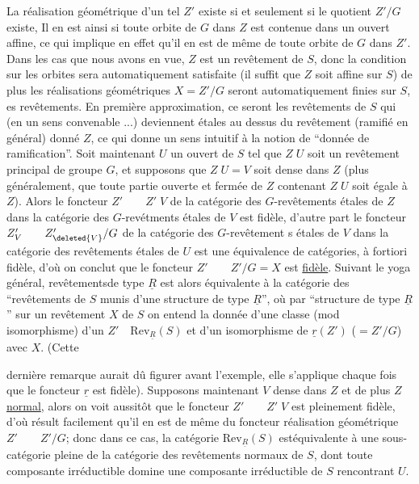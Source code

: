 La réalisation géométrique d'un tel $Z'$ existe si et seulement si le quotient $Z'/G$ existe,  Il en est ainsi si toute orbite de $G$ dans $Z$ est contenue dans un ouvert affine, ce qui implique en effet qu'il en est de même de toute orbite de $G$ dans $Z'$.  Dans les cas que nous avons en vue, $Z$ est un revêtement de $S$, donc la condition sur les orbites sera automatiquement satisfaite (il suffit que $Z$ soit affine sur $S$) de plus les réalisations géométriques $X=Z'/G$ seront automatiquement finies sur $S$,  es revêtements. En première approximation, ce seront les revêtements de $S$ qui (en  un sens convenable ...) deviennent étales au dessus du revêtement (ramifié en général) donné $Z$, ce qui donne un sens intuitif à la notion de ``donnée de ramification''. Soit maintenant $U$ un ouvert de $S$ tel que $Z\;U$ soit un revêtement principal de groupe $G$, et supposons que $Z\;U=V$ soit dense dans $Z$ (plus généralement, que toute partie ouverte et fermée de $Z$ contenant $Z\;U$  soit égale à $Z$). Alors le foncteur $Z'\qquad Z'\;V$ de la catégorie des $G$-revêtements étales de $Z$ dans la catégorie des $G$-revétments étales de $V$ est fidèle, d'autre part le foncteur $Z'_V\qquad Z'_{\deleted{V}}/G$ de la catégorie des $G$-revêtement s étales de $V$ dans la catégorie des revêtements étales de $U$ est une équivalence de catégories, à fortiori fidèle, d'où on conclut que le foncteur  $Z'\qquad Z'/G=X$ est \uline{fidèle}. Suivant le yoga général,  revêtementsde type $\underline{R}$  est alors équivalente à la catégorie des ``revêtements de $S$ munis d'une structure de type $\underline{R}$'', où par ``structure de type $\underline{R}$'' sur un revêtement $X$ de $S$ on entend la donnée d'une classe (mod isomorphisme) d'un $Z'\quad\mathrm{Rev}_{\underline{R}}(S)$ et d'un isomorphisme de $\underline{r}(Z')$ ($=Z'/G$) avec $X$. (Cette

dernière remarque aurait dû figurer avant l'exemple, elle s'applique chaque fois que le foncteur $\underline{r}$ est fidèle).  Supposons maintenant $V$ dense dans $Z$ et de plus $Z$ \uline{normal}, alors on voit aussitôt que le foncteur $Z'\qquad Z'\;V$ est pleinement fidèle, d'où résult facilement qu'il en est de même du foncteur réalisation géométrique $Z'\qquad Z'/G$; donc dans ce cas, la catégorie $\mathrm{Rev}_{\underline{R}}(S)$  estéquivalente à une sous-catégorie pleine de la catégorie des revêtements  normaux de $S$, dont toute composante  irréductible domine une composante irréductible de $S$ rencontrant $U$.

